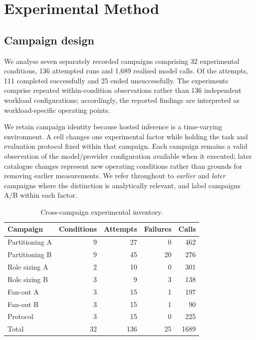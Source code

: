 \documentclass[conference]{IEEEtran}
\begin{document}
\section{Experimental Method}
\subsection{Campaign design}
We analyse seven separately recorded campaigns comprising 32 experimental conditions, 136 attempted runs and 1{,}689 realised model calls. Of the attempts, 111 completed successfully and 25 ended unsuccessfully. The experiments comprise repeated within-condition observations rather than 136 independent workload configurations; accordingly, the reported findings are interpreted as workload-specific operating points.

We retain campaign identity because hosted inference is a time-varying environment. A cell changes one experimental factor while holding the task and evaluation protocol fixed within that campaign. Each campaign remains a valid observation of the model/provider configuration available when it executed; later catalogue changes represent new operating conditions rather than grounds for removing earlier measurements. We refer throughout to \emph{earlier} and \emph{later} campaigns where the distinction is analytically relevant, and label campaigns A/B within each factor.

\begin{table}[t]
\caption{Cross-campaign experimental inventory.}
\label{tab:inventory}
\centering\scriptsize
\begin{tabular}{lrrrr}
\toprule
Campaign & Conditions & Attempts & Failures & Calls\\
\midrule
Partitioning A & 9 & 27 & 0 & 462\\
Partitioning B & 9 & 45 & 20 & 276\\
Role sizing A & 2 & 10 & 0 & 301\\
Role sizing B & 3 & 9 & 3 & 138\\
Fan-out A & 3 & 15 & 1 & 197\\
Fan-out B & 3 & 15 & 1 & 90\\
Protocol & 3 & 15 & 0 & 225\\
\midrule
Total & 32 & 136 & 25 & 1689\\
\bottomrule
\end{tabular}
\end{table}
\end{document}
